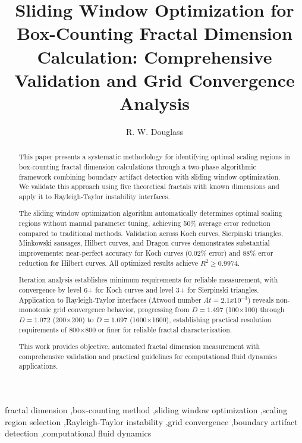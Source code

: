 \documentclass[preprint,12pt]{elsarticle}
\def\times{x}%
\begin{document}
\begin{frontmatter}

\title{Sliding Window Optimization for Box-Counting Fractal Dimension Calculation: Comprehensive Validation and Grid Convergence Analysis}

\author{R. W. Douglass}



\begin{abstract}
This paper presents a systematic methodology for identifying optimal scaling regions in box-counting fractal dimension calculations through a two-phase algorithmic framework combining boundary artifact detection with sliding window optimization. We validate this approach using five theoretical fractals with known dimensions and apply it to Rayleigh-Taylor instability interfaces.

The sliding window optimization algorithm automatically determines optimal scaling regions without manual parameter tuning, achieving 50\% average error reduction compared to traditional methods. Validation across Koch curves, Sierpinski triangles, Minkowski sausages, Hilbert curves, and Dragon curves demonstrates substantial improvements: near-perfect accuracy for Koch curves (0.02\% error) and 88\% error reduction for Hilbert curves. All optimized results achieve $R^2 \geq 0.9974$.

Iteration analysis establishes minimum requirements for reliable measurement, with convergence by level 6+ for Koch curves and level 3+ for Sierpinski triangles. Application to Rayleigh-Taylor interfaces (Atwood number $At = 2.1 \times 10^{-3}$) reveals non-monotonic grid convergence behavior, progressing from $D = 1.497$ (100×100) through $D = 1.072$ (200×200) to $D = 1.697$ (1600×1600), establishing practical resolution requirements of 800×800 or finer for reliable fractal characterization.

This work provides objective, automated fractal dimension measurement with comprehensive validation and practical guidelines for computational fluid dynamics applications.
\end{abstract}

\begin{keyword}
fractal dimension \sep box-counting method \sep sliding window optimization \sep scaling region selection \sep Rayleigh-Taylor instability \sep grid convergence \sep boundary artifact detection \sep computational fluid dynamics
\end{keyword}

\end{frontmatter}
\end{document}
